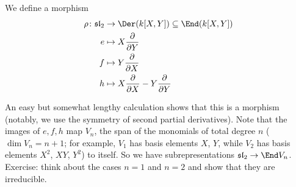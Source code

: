 We define a morphism
\begin{align*}
	\rho\colon \mathfrak{sl}_2&\to \Der(k[X, Y]) \subseteq \End(k[X, Y])\\
	e&\mapsto X\frac{\partial}{\partial Y}\\
	f&\mapsto Y\frac{\partial}{\partial X}\\
	h&\mapsto X\frac{\partial}{\partial X}-Y\frac{\partial}{\partial Y}
\end{align*}

An easy but somewhat lengthy calculation shows that this is a morphism (notably,
we use the symmetry of second partial derivatives).
Note that the images of $e, f, h$ map
$V_n$, the span of the monomials of total degree $n$ ($\dim V_n = n + 1$; for example,
$V_1$ has basis elements $X$, $Y$, while $V_2$ has basis elements $X^2$, $XY$, $Y^2$)
to itself.
So we have subrepresentations $\mathfrak{sl}_2\to \End V_n$.
Exercise: think about the cases $n = 1$ and $n = 2$ and show that they are
irreducible.
